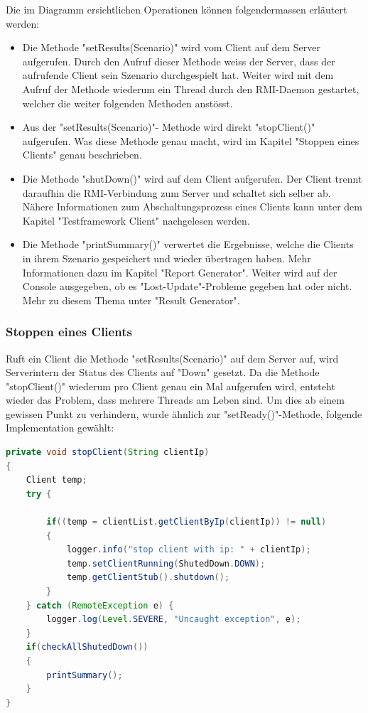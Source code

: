 Die im Diagramm ersichtlichen Operationen können folgender\-massen er\-läu\-tert werden:
\begin{itemize}
\item Die Methode "setResults(Scenario)" wird vom Client auf dem Server auf\-ge\-rufen. Durch den Aufruf dieser Methode weiss der Server, dass der aufrufende Client sein Szenario durchgespielt hat. Weiter wird mit dem Aufruf der Methode wiederum ein Thread durch den RMI-Daemon gestartet, welcher die weiter folgenden Methoden anstösst.
\item Aus der "setResults(Scenario)"- Methode wird di\-rekt "stopClient()" auf\-ge\-rufen. Was diese Methode genau macht, wird im Kapitel "Stoppen eines Clients" genau beschrieben.
\item Die Methode "shutDown()" wird auf dem Client aufgerufen. Der Client trennt daraufhin die RMI-Verbindung zum Server und schaltet sich selber ab. Nähere Informationen zum Abschaltungsprozess eines Clients kann unter dem Kapitel "Testframework Client" nachgelesen werden.
\item Die Methode "printSummary()" verwertet die Ergebnisse, welche die Clients in ihrem Szenario gespeichert und wieder übertragen haben. Mehr Informationen dazu im Kapitel "Report Generator". Weiter wird auf der Console ausgegeben, ob es "Lost-Update"-Probleme gegeben hat oder nicht. Mehr zu diesem Thema unter "Result Generator".
\end{itemize}

\subsubsection{Stoppen eines Clients}
\label{sec:stopClient}
Ruft ein Client die Methode "setResults(Scenario)" auf dem Server auf, wird Serverintern der Status des Clients auf "Down" gesetzt. Da die Methode "stopClient()" wiederum pro Client genau ein Mal aufgerufen wird, entsteht wieder das Problem, dass mehrere Threads am Leben sind. Um dies ab einem gewissen Punkt zu verhindern, wurde ähnlich zur "setReady()"-Methode, folgende Implementation gewählt:
\begin{lstlisting}[language=java, breaklines=true]
private void stopClient(String clientIp)
{
	Client temp;
	try {
		
		if((temp = clientList.getClientByIp(clientIp)) != null)
		{
			logger.info("stop client with ip: " + clientIp);
			temp.setClientRunning(ShutedDown.DOWN);
			temp.getClientStub().shutdown();
		}
	} catch (RemoteException e) {
		logger.log(Level.SEVERE, "Uncaught exception", e);
	}
	if(checkAllShutedDown())
	{
		printSummary();
	}
}
\end{lstlisting}

